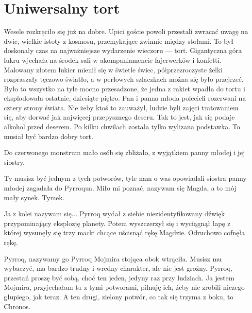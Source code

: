 \chapter{Uniwersalny tort}


Wesele rozkręciło się już na dobre. 
Upici goście powoli przestali zwracać uwagę na dwie, wielkie istoty z kosmosu, przemykające zwinnie między stołami.
To był doskonały czas na najważniejsze wydarzenie wieczoru --- tort.
Gigantyczna góra lukru wjechała na środek sali w akompaniamencie fajerwerków i konfetti. 
Malowany złotem lukier mienił się w świetle świec, półprzezroczyste żelki rozpraszały tęczowo światło, a w perłowych szlaczkach można się było przejrzeć.
Było to wszystko na tyle mocno przesadzone, że jedna z rakiet wpadła do tortu i eksplodowała ostatnie, dziesiąte piętro.
Pan i panna młoda polecieli rozerwani na cztery strony świata.
Nie żeby ktoś to zauważył, ludzie byli zajęci tratowaniem się, aby dorwać jak najwięcej przepysznego deseru. 
Tak to jest, jak się podaje alkohol przed deserem.
Po kilku chwilach została tylko wylizana podstawka. To musiał być bardzo dobry tort.

Do czerwonego monstrum mało osób się zbliżało, z wyjątkiem panny młodej i jej siostry.

\ds{} Ty musisz być jednym z tych potworów, tyle nam o was opowiadali \dm{} siostra panny młodej zagadała do Pyrroqua. \dm{}
Miło mi poznać, nazywam się Magda, a to mój mały synek. Tymek. \de{}

\ds{} Ja z kolei nazywam się... \dm{} Pyrroq wydał z siebie niezidentyfikowany dźwięk przypominający eksplozję planety.
Potem wyszczerzył się i wyciągnął łapę z której wysunęły się trzy macki chcące uścisnąć rękę Magdzie. Odruchowo cofnęła rękę. \de{}

\ds{} Pyrroq, nazywamy go Pyrroq \dm{} Mojmira stojąca obok wtrąciła. \dm{} Musisz mu wybaczyć, ma bardzo trudny i wredny charakter, ale nie jest groźny. 
Pyrroq, przestań proszę być sobą, choć ten jeden, jedyny raz przy ludziach.
Ja jestem Mojmira, przyjechałam tu z tymi potworami, pilnuję ich, żeby nie zrobili niczego głupiego, jak teraz. 
A ten drugi, zielony potwór, co tak się trzyma z boku, to Chronos. \de{}

